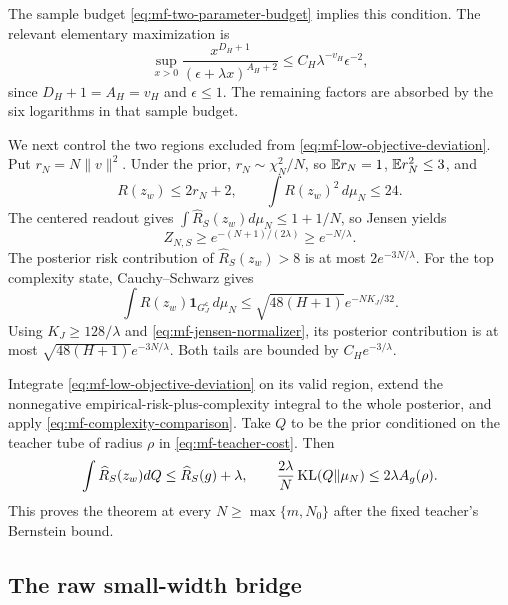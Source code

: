 The sample budget \eqref{eq:mf-two-parameter-budget} implies this
condition.  The relevant elementary maximization is
\[
 \sup_{x>0}\frac{x^{D_H+1}}
                     {(\epsilon+\lambda x)^{A_H+2}}
 \le C_H\lambda^{-v_H}\epsilon^{-2},
\]
since $D_H+1=A_H=v_H$ and $\epsilon\le1$.  The remaining factors are absorbed by the six
logarithms in that sample budget.

We next control the two regions excluded from
\eqref{eq:mf-low-objective-deviation}.  Put $r_N=N\|v\|^2$.
Under the prior, $r_N\sim\chi_N^2/N$, so
$\mathbb E r_N=1$, $\mathbb E r_N^2\le3$, and
\[
 R(z_w)\le2r_N+2,\qquad \int R(z_w)^2\,d\mu_N\le24.
\]
The centered readout gives $\int\widehat R_S(z_w)d\mu_N\le1+1/N$,
so Jensen yields
\begin{equation}\label{eq:mf-jensen-normalizer}
 Z_{N,S}\ge e^{-(N+1)/(2\lambda)}\ge e^{-N/\lambda}.
\end{equation}
The posterior risk contribution of $\widehat R_S(z_w)>8$ is at most
$2e^{-3N/\lambda}$.  For the top complexity state, Cauchy--Schwarz gives
\[
 \int R(z_w)\mathbf1_{G_J^{\mathsf c}}\,d\mu_N
 \le\sqrt{48(H+1)}e^{-NK_J/32}.
\]
Using $K_J\ge128/\lambda$ and
\eqref{eq:mf-jensen-normalizer}, its posterior contribution is at most
$\sqrt{48(H+1)}e^{-3N/\lambda}$.  Both tails are bounded by
$C_He^{-3/\lambda}$.

Integrate \eqref{eq:mf-low-objective-deviation} on its valid region,
extend the nonnegative empirical-risk-plus-complexity integral to the
whole posterior, and apply
\eqref{eq:mf-complexity-comparison}.  Take $Q$ to be the prior
conditioned on the teacher tube of radius $\rho$ in
\eqref{eq:mf-teacher-cost}.  Then
\[
 \int\widehat R_S(z_w)dQ\le\widehat R_S(g)+\lambda,
 \qquad \frac{2\lambda}{N}\operatorname{KL}(Q\Vert\mu_N)
             \le2\lambda A_g(\rho).
\]
This proves the theorem at every $N\ge\max\{m,N_0\}$ after the fixed
teacher's Bernstein bound.

\subsection{The raw small-width bridge}

